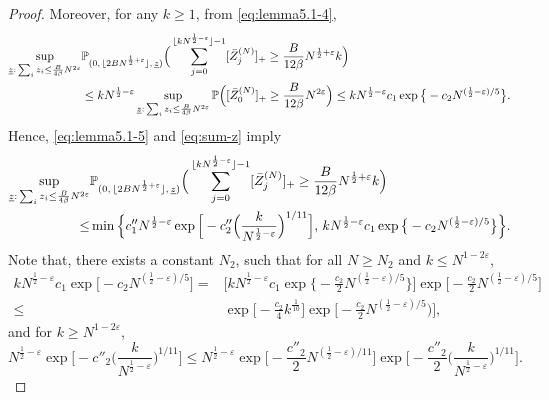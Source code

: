 \documentclass[10pt,a4paper]{amsart}
\begin{document}
\begin{proof}
Moreover,  for any $k\geq 1$, from \eqref{eq:lemma5.1-4},
\begin{align}\label{eq:sum-z}
     \sup_{\underline{z}: \, \sum_iz_i \leq \frac{B}{4\beta}N^{2\varepsilon}}&\mathbb{P}_{(0, \, \lfloor 2BN^{\frac{1}{2}+\varepsilon} \rfloor, \,\underline{z})}\Big(\sum_{j=0}^{\lfloor kN^{\frac{1}{2}-\varepsilon}\rfloor-1}[\Bar{Z}^{(N)}_j]_+\geq \frac{B}{12\beta}N^{\frac{1}{2}+\varepsilon}k\Big)\nonumber\\
     &\leq kN^{\frac{1}{2}-\varepsilon} \sup_{\underline{z}: \, \sum_iz_i \leq \frac{B}{4\beta}N^{2\varepsilon}}\mathbb{P}\Big([\Bar{Z}^{(N)}_0]_+\geq \frac{B}{12\beta}N^{2\varepsilon}\Big)\leq  kN^{\frac{1}{2}-\varepsilon}c_1\exp \big\{-c_2N^{(\frac{1}{2}-\varepsilon)/5}\big\}.
\end{align}
Hence, \eqref{eq:lemma5.1-5} and \eqref{eq:sum-z} imply
\begin{align}\label{nex0}
    \sup_{\underline{z}: \, \sum_iz_i \leq \frac{B}{4\beta}N^{2\varepsilon}}&\mathbb{P}_{(0, \, \lfloor 2BN^{\frac{1}{2}+\varepsilon} \rfloor, \,\underline{z})}\Big(\sum_{j=0}^{\lfloor kN^{\frac{1}{2}-\varepsilon}\rfloor-1}[\Bar{Z}^{(N)}_j]_+\geq \frac{B}{12\beta}N^{\frac{1}{2}+\varepsilon}k\Big)\nonumber\\
    \leq& \min \Big\{c_1''N^{\frac{1}{2}-\varepsilon}\exp\Big[-c''_2\Big(\frac{k}{N^{\frac{1}{2}-\varepsilon}}\Big)^{1/11}\Big], \, kN^{\frac{1}{2}-\varepsilon}c_1\exp \big\{-c_2N^{(\frac{1}{2}-\varepsilon)/5}\big\}\Big\}.
\end{align}
Note that, there exists a constant $N_2$, such that for all $N\geq N_2$ and $k\leq N^{1-2\varepsilon}$,
\begin{align*}
    kN^{\frac{1}{2}-\varepsilon}c_1\exp \big[-c_2N^{(\frac{1}{2}-\varepsilon)/5}\big]
    =&\Big[kN^{\frac{1}{2}-\varepsilon}c_1\exp \big\{-\frac{c_2}{2}N^{(\frac{1}{2}-\varepsilon)/5}\big\}\Big]\exp \big[-\frac{c_2}{2}N^{(\frac{1}{2}-\varepsilon)/5}\big]\\
    \leq & \exp \big[-\frac{c_2}{4}k^{\frac{1}{10}}\big]\exp \big[-\frac{c_2}{2}N^{(\frac{1}{2}-\varepsilon)/5})\big],
\end{align*}
and for $k\geq N^{1-2\varepsilon}$,
$$
    N^{\frac{1}{2}-\varepsilon}\exp\Big[-c''_2\Big(\frac{k}{N^{\frac{1}{2}-\varepsilon}}\Big)^{1/11}\Big]
    \leq  N^{\frac{1}{2}-\varepsilon}\exp\Big[-\frac{c''_2}{2}N^{(\frac{1}{2}-\varepsilon)/11}\Big]\exp\Big[-\frac{c''_2}{2}\Big(\frac{k}{N^{\frac{1}{2}-\varepsilon}}\Big)^{1/11}\Big].
$$
\end{proof}
\end{document}
